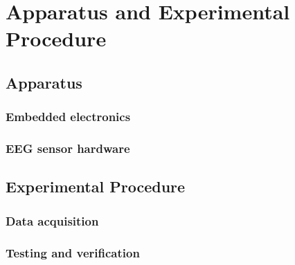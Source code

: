 \chapter{Apparatus and Experimental Procedure}

\graphicspath{ {report/Chapter4/assets/} } 

\section{Apparatus}
\subsection{Embedded electronics}
\subsection{EEG sensor hardware}

\section{Experimental Procedure}
\subsection{Data acquisition}
\subsection{Testing and verification}